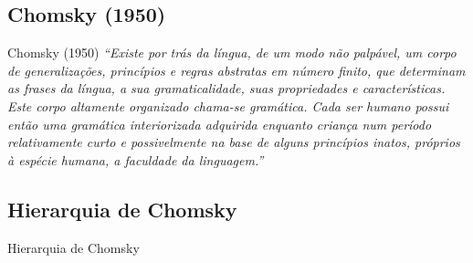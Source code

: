 \renewcommand{\titulo}{Chomsky (1950)}
\subsection{\titulo}
\begin{frame}{\titulo}
\emph{``Existe por trás da língua, de um modo não palpável, um corpo de generalizações, princípios e regras abstratas em número finito, que determinam as frases da língua, a sua gramaticalidade, suas propriedades e características. Este corpo altamente organizado chama-se gramática. Cada ser humano possui então uma gramática interiorizada adquirida enquanto	criança num período relativamente curto e possivelmente	na base de alguns princípios inatos, próprios à espécie	humana, a faculdade da linguagem.''}
\end{frame}


\renewcommand{\titulo}{Hierarquia de Chomsky}
\subsection{\titulo}
\begin{frame}{\titulo}
\end{frame}


